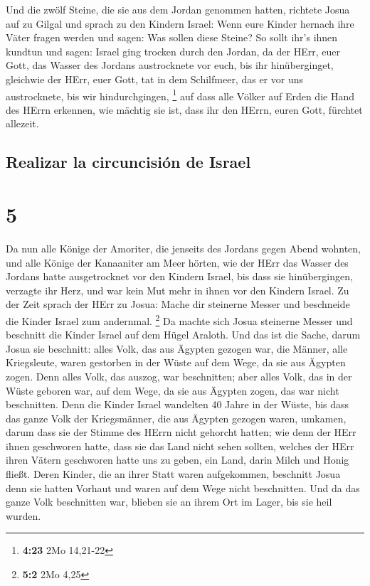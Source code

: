  Und die zwölf Steine, die sie aus dem Jordan genommen
hatten, richtete Josua auf zu Gilgal  und sprach zu den
Kindern Israel: Wenn eure Kinder hernach ihre Väter fragen werden und
sagen: Was sollen diese Steine?  So sollt ihr's ihnen
kundtun und sagen: Israel ging trocken durch den Jordan, 
da der HErr, euer Gott, das Wasser des Jordans austrocknete vor euch,
bis ihr hinüberginget, gleichwie der HErr, euer Gott, tat in dem
Schilfmeer, das er vor uns austrocknete, bis wir hindurchgingen,
\footnote{\textbf{4:23} 2Mo 14,21-22}  auf dass alle
Völker auf Erden die Hand des HErrn erkennen, wie mächtig sie ist, dass
ihr den HErrn, euren Gott, fürchtet allezeit.

\hypertarget{realizar-la-circuncisiuxf3n-de-israel}{%
\subsection{Realizar la circuncisión de
Israel}\label{realizar-la-circuncisiuxf3n-de-israel}}

\hypertarget{section-4}{%
\section{5}\label{section-4}}

 Da nun alle Könige der Amoriter, die jenseits des Jordans
gegen Abend wohnten, und alle Könige der Kanaaniter am Meer hörten, wie
der HErr das Wasser des Jordans hatte ausgetrocknet vor den Kindern
Israel, bis dass sie hinübergingen, verzagte ihr Herz, und war kein Mut
mehr in ihnen vor den Kindern Israel.  Zu der Zeit sprach
der HErr zu Josua: Mache dir steinerne Messer und beschneide die Kinder
Israel zum andernmal. \footnote{\textbf{5:2} 2Mo 4,25}  Da
machte sich Josua steinerne Messer und beschnitt die Kinder Israel auf
dem Hügel Araloth.  Und das ist die Sache, darum Josua sie
beschnitt: alles Volk, das aus Ägypten gezogen war, die Männer, alle
Kriegsleute, waren gestorben in der Wüste auf dem Wege, da sie aus
Ägypten zogen.  Denn alles Volk, das auszog, war
beschnitten; aber alles Volk, das in der Wüste geboren war, auf dem
Wege, da sie aus Ägypten zogen, das war nicht beschnitten.
 Denn die Kinder Israel wandelten 40 Jahre in der Wüste,
bis dass das ganze Volk der Kriegsmänner, die aus Ägypten gezogen waren,
umkamen, darum dass sie der Stimme des HErrn nicht gehorcht hatten; wie
denn der HErr ihnen geschworen hatte, dass sie das Land nicht sehen
sollten, welches der HErr ihren Vätern geschworen hatte uns zu geben,
ein Land, darin Milch und Honig fließt.  Deren Kinder, die
an ihrer Statt waren aufgekommen, beschnitt Josua denn sie hatten
Vorhaut und waren auf dem Wege nicht beschnitten.  Und da
das ganze Volk beschnitten war, blieben sie an ihrem Ort im Lager, bis
sie heil wurden.


